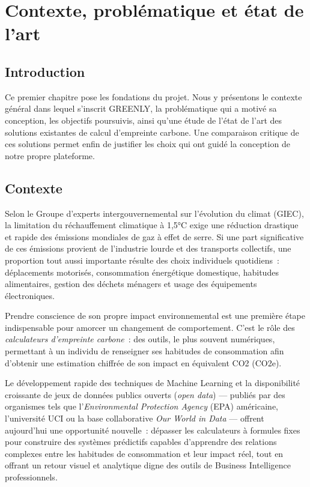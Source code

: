 \chapter{Contexte, problématique et état de l'art}

\section*{Introduction}
Ce premier chapitre pose les fondations du projet. Nous y présentons le contexte général dans lequel s'inscrit GREENLY, la problématique qui a motivé sa conception, les objectifs poursuivis, ainsi qu'une étude de l'état de l'art des solutions existantes de calcul d'empreinte carbone. Une comparaison critique de ces solutions permet enfin de justifier les choix qui ont guidé la conception de notre propre plateforme.

\section{Contexte}

Selon le Groupe d'experts intergouvernemental sur l'évolution du climat (GIEC), la limitation du réchauffement climatique à 1,5°C exige une réduction drastique et rapide des émissions mondiales de gaz à effet de serre. Si une part significative de ces émissions provient de l'industrie lourde et des transports collectifs, une proportion tout aussi importante résulte des choix individuels quotidiens~: déplacements motorisés, consommation énergétique domestique, habitudes alimentaires, gestion des déchets ménagers et usage des équipements électroniques.

Prendre conscience de son propre impact environnemental est une première étape indispensable pour amorcer un changement de comportement. C'est le rôle des \textit{calculateurs d'empreinte carbone}~: des outils, le plus souvent numériques, permettant à un individu de renseigner ses habitudes de consommation afin d'obtenir une estimation chiffrée de son impact en équivalent CO2 (CO2e).

Le développement rapide des techniques de Machine Learning et la disponibilité croissante de jeux de données publics ouverts (\textit{open data}) — publiés par des organismes tels que l'\textit{Environmental Protection Agency} (EPA) américaine, l'université UCI ou la base collaborative \textit{Our World in Data} — offrent aujourd'hui une opportunité nouvelle~: dépasser les calculateurs à formules fixes pour construire des systèmes prédictifs capables d'apprendre des relations complexes entre les habitudes de consommation et leur impact réel, tout en offrant un retour visuel et analytique digne des outils de Business Intelligence professionnels.


